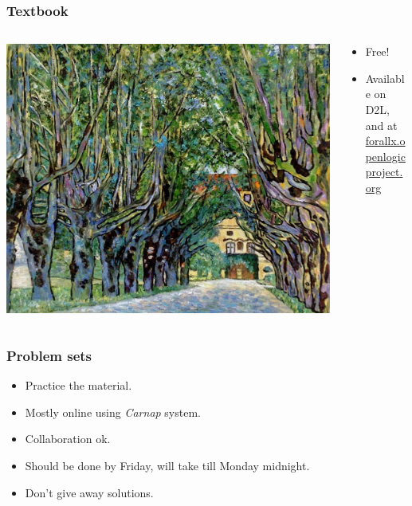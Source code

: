 \begin{frame}
  \frametitle{Textbook}

  \begin{columns}
    \begin{column}{.3\textwidth}
\includegraphics[height=.9\textheight]{../assets/Klimt_Kammer_1.jpg}
    \end{column}
    \begin{column}{.6\textwidth}
      \begin{itemize}
        \item Free!
        \item Available on D2L, and at\\ \href{https://forallx.openlogicproject.org/}{forallx.openlogicproject.org}
      \end{itemize}
    \end{column}
  \end{columns}
\end{frame}


\begin{frame}
  \frametitle{Problem sets}

  \begin{itemize}[<+->]
    \item Practice the material.
    \item Mostly online using \textit{Carnap} system.
    \item Collaboration ok.
    \item Should be done by Friday, will take till Monday midnight.
    \item Don't give away solutions.
  \end{itemize} 
\end{frame}

